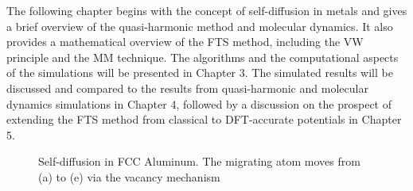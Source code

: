 \documentclass{article}
\begin{document}
The following chapter begins with the concept of self-diffusion in metals and gives a brief overview of the quasi-harmonic method and molecular dynamics. It also provides a mathematical overview of the FTS method, including the VW principle and the MM technique. The algorithms and the computational aspects of the simulations will be presented in Chapter 3. The simulated results will be discussed and compared to the results from quasi-harmonic and molecular dynamics simulations in Chapter 4, followed by a discussion on the prospect of extending the FTS method from classical to DFT-accurate potentials in Chapter 5.

\begin{figure}[!htp]
\centering
{}
\hfill
{}
\caption{Self-diffusion in FCC Aluminum. The migrating atom moves from (a) to (e) via the vacancy mechanism}
\label{fig:1}
\end{figure}
\end{document}
